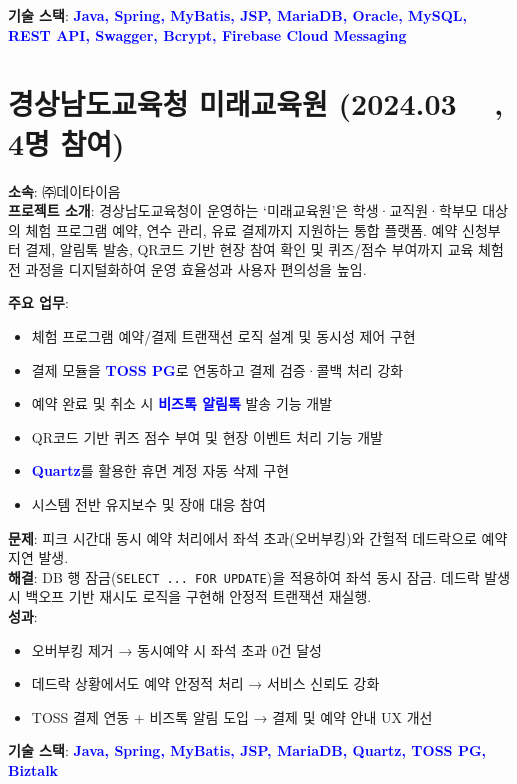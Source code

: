 \documentclass[a4paper,11pt]{article}
\newcommand{\tech}[1]{\textbf{\textcolor{blue}{#1}}}
\begin{document}
\textbf{기술 스택}: \tech{Java, Spring, MyBatis, JSP, MariaDB, Oracle, MySQL, REST API, Swagger, Bcrypt, Firebase Cloud Messaging}

\section{경상남도교육청 미래교육원 (2024.03 ~ , 4명 참여)}

\textbf{소속}: ㈜데이타이음 \\
\textbf{프로젝트 소개}:  
경상남도교육청이 운영하는 ‘미래교육원’은 학생·교직원·학부모 대상의  
체험 프로그램 예약, 연수 관리, 유료 결제까지 지원하는 통합 플랫폼.  
예약 신청부터 결제, 알림톡 발송, QR코드 기반 현장 참여 확인 및 퀴즈/점수 부여까지  
교육 체험 전 과정을 디지털화하여 운영 효율성과 사용자 편의성을 높임.

\textbf{주요 업무}:
\begin{itemize}[leftmargin=*]
  \item 체험 프로그램 예약/결제 트랜잭션 로직 설계 및 동시성 제어 구현
  \item 결제 모듈을 \tech{TOSS PG}로 연동하고 결제 검증·콜백 처리 강화
  \item 예약 완료 및 취소 시 \tech{비즈톡 알림톡} 발송 기능 개발
  \item QR코드 기반 퀴즈 점수 부여 및 현장 이벤트 처리 기능 개발
  \item \tech{Quartz}를 활용한 휴면 계정 자동 삭제 구현
  \item 시스템 전반 유지보수 및 장애 대응 참여
\end{itemize}

\textbf{문제}: 피크 시간대 동시 예약 처리에서 좌석 초과(오버부킹)와 간헐적 데드락으로 예약 지연 발생. \\
\textbf{해결}: DB 행 잠금(\verb|SELECT ... FOR UPDATE|)을 적용하여 좌석 동시 잠금. 데드락 발생 시 백오프 기반 재시도 로직을 구현해 안정적 트랜잭션 재실행. \\
\textbf{성과}:
\begin{itemize}[leftmargin=*]
  \item 오버부킹 제거 → 동시예약 시 좌석 초과 0건 달성
  \item 데드락 상황에서도 예약 안정적 처리 → 서비스 신뢰도 강화
  \item TOSS 결제 연동 + 비즈톡 알림 도입 → 결제 및 예약 안내 UX 개선
\end{itemize}

\textbf{기술 스택}: \tech{Java, Spring, MyBatis, JSP, MariaDB, Quartz, TOSS PG, Biztalk}
\end{document}
